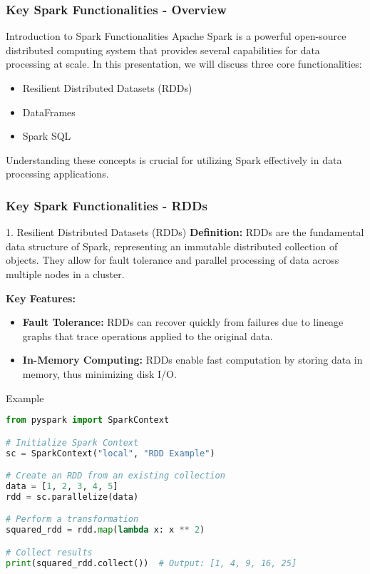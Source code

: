 \documentclass[aspectratio=169]{beamer}
\begin{document}
\begin{frame}[fragile]
    \frametitle{Key Spark Functionalities - Overview}
    \begin{block}{Introduction to Spark Functionalities}
        Apache Spark is a powerful open-source distributed computing system that provides several capabilities for data processing at scale. 
        In this presentation, we will discuss three core functionalities:
        \begin{itemize}
            \item Resilient Distributed Datasets (RDDs)
            \item DataFrames
            \item Spark SQL
        \end{itemize}
        Understanding these concepts is crucial for utilizing Spark effectively in data processing applications.
    \end{block}
\end{frame}

\begin{frame}[fragile]
    \frametitle{Key Spark Functionalities - RDDs}
    \begin{block}{1. Resilient Distributed Datasets (RDDs)}
        \textbf{Definition:} RDDs are the fundamental data structure of Spark, representing an immutable distributed collection of objects. They allow for fault tolerance and parallel processing of data across multiple nodes in a cluster.

        \textbf{Key Features:}
        \begin{itemize}
            \item \textbf{Fault Tolerance:} RDDs can recover quickly from failures due to lineage graphs that trace operations applied to the original data.
            \item \textbf{In-Memory Computing:} RDDs enable fast computation by storing data in memory, thus minimizing disk I/O.
        \end{itemize}
    \end{block}
    
    \begin{block}{Example}
        \begin{lstlisting}[language=Python]
from pyspark import SparkContext

# Initialize Spark Context
sc = SparkContext("local", "RDD Example")

# Create an RDD from an existing collection
data = [1, 2, 3, 4, 5]
rdd = sc.parallelize(data)

# Perform a transformation
squared_rdd = rdd.map(lambda x: x ** 2)

# Collect results
print(squared_rdd.collect())  # Output: [1, 4, 9, 16, 25]
        \end{lstlisting}
    \end{block}
\end{frame}
\end{document}
